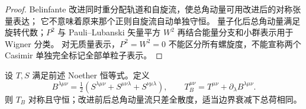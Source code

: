 \begin{proof}
Belinfante 改进同时重分配轨道和自旋流，使总角动量可用改进后的对称张量表达；
它不意味着原来那个正则自旋流自动单独守恒。
量子化后总角动量满足旋转代数；$P^2$ 与 Pauli--Lubanski 矢量平方 $W^2$
再结合能量分支和小群表示用于 Wigner 分类。
对无质量表示，$P^2=W^2=0$ 不能区分所有螺旋度，不能宣称两个 Casimir
单独完全标记全部单粒子表示。
\end{proof}

\begin{proposition}
设 $T,S$ 满足前述 Noether 恒等式。定义\[B^{\lambda\mu\nu}=\tfrac12(S^{\lambda\mu\nu}+S^{\mu\nu\lambda}+S^{\nu\mu\lambda}),\qquad T_B^{\mu\nu}=T^{\mu\nu}+\partial_\lambda B^{\lambda\mu\nu}.\]则 $T_B$ 对称且守恒；改进前后总角动量流只差全散度，适当边界衰减下总荷相同。
\end{proposition}

